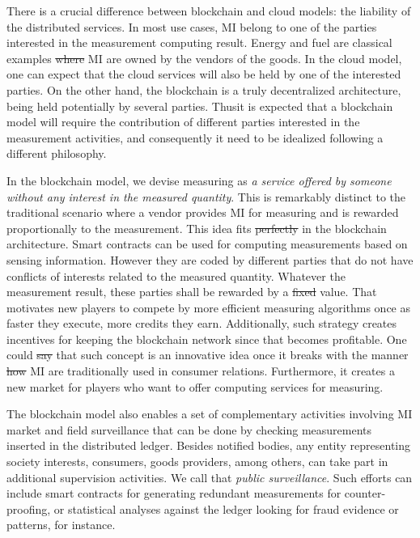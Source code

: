 \documentclass[journal]{IEEEtran}
\providecommand{\DIFadd}[1]{{\protect\color{blue}\uwave{#1}}} %
\providecommand{\DIFdel}[1]{{\protect\color{red}\sout{#1}}}                      %
\providecommand{\DIFaddbegin}{} %
\providecommand{\DIFaddend}{} %
\providecommand{\DIFdelbegin}{} %
\providecommand{\DIFdelend}{} %
\begin{document}
There is a crucial difference between blockchain and cloud models: the liability of the distributed services. 
In most use cases, MI belong to one of the parties interested in the measurement computing result. 
Energy and fuel are classical examples \DIFdelbegin \DIFdel{where }\DIFdelend \DIFaddbegin \DIFadd{given that }\DIFaddend MI are owned by the vendors of the goods.
In the cloud model, one can expect that the cloud services will also be held by one of the interested parties. 
On the other hand, the blockchain is a truly decentralized architecture, being held potentially by several parties. 
Thus\DIFaddbegin \DIFadd{, }\DIFaddend it is expected that a blockchain model will require the contribution of different parties interested in the measurement activities, and consequently it need to be idealized following a different philosophy.

In the blockchain model, we devise measuring as \emph{a service offered by someone without any interest in the measured quantity}. 
This is remarkably distinct to the traditional scenario where a vendor provides MI for measuring and is rewarded proportionally to the measurement. 
This idea fits \DIFdelbegin \DIFdel{perfectly }\DIFdelend \DIFaddbegin \DIFadd{very well }\DIFaddend in the blockchain architecture. 
Smart contracts can be used for computing measurements based on sensing information. 
However they are coded by different parties that do not have conflicts of interests related to the measured quantity. Whatever the measurement result, these parties shall be rewarded by a \DIFdelbegin \DIFdel{fixed }\DIFdelend \DIFaddbegin \DIFadd{preset }\DIFaddend value. 
That motivates new players to compete by more efficient measuring algorithms once as faster they execute, more credits they \DIFaddbegin \DIFadd{can }\DIFaddend earn.
Additionally, such strategy creates incentives for keeping the blockchain network since that becomes profitable. 
One could \DIFdelbegin \DIFdel{say }\DIFdelend \DIFaddbegin \DIFadd{argue }\DIFaddend that such concept is an innovative idea once it breaks with the manner \DIFdelbegin \DIFdel{how }\DIFdelend MI are traditionally used in consumer relations.
Furthermore, it creates a new market for players who want to offer computing services for measuring. 

The blockchain model also enables a set of complementary activities involving MI market and field surveillance that can be done by checking measurements inserted in the distributed ledger. Besides notified bodies, any entity representing society interests, consumers, goods providers, among others, can take part in additional supervision activities. We call that \emph{public surveillance}. Such efforts can include smart contracts for generating redundant measurements for counter-proofing, or statistical analyses against the ledger looking for fraud evidence or patterns, for instance.
\end{document}
